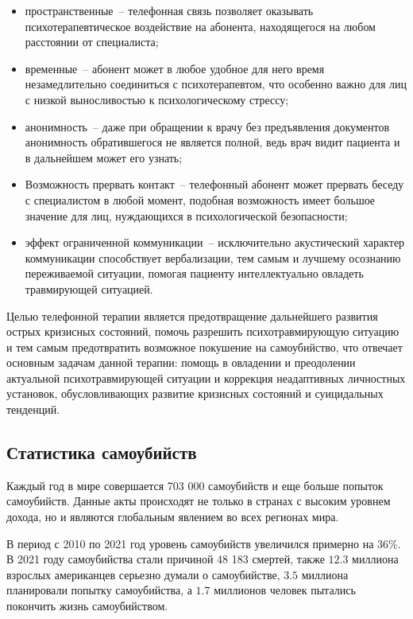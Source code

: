 \begin{itemize}
	\item пространственные~-- телефонная связь позволяет оказывать психотерапевтическое воздействие на абонента, находящегося на любом расстоянии от специалиста;
	\item временные~-- абонент может в любое удобное для него время незамедлительно соединиться с психотерапевтом, что особенно важно для лиц с низкой выносливостью к психологическому стрессу;
	\item анонимность~-- даже при обращении к врачу без предъявления документов анонимность обратившегося не является полной, ведь врач видит пациента и в дальнейшем может его узнать;
	\item Возможность прервать контакт~-- телефонный абонент может прервать беседу с специалистом в любой момент, подобная возможность имеет большое значение для лиц, нуждающихся в психологической безопасности;
	\item эффект ограниченной коммуникации~-- исключительно акустический характер коммуникации способствует вербализации, тем самым и лучшему осознанию переживаемой ситуации, помогая пациенту интеллектуально овладеть травмирующей ситуацией.
\end{itemize}

Целью телефонной терапии является предотвращение дальнейшего развития острых кризисных состояний, помочь разрешить психотравмирующую ситуацию и тем самым предотвратить возможное покушение на самоубийство, что отвечает основным задачам данной терапии: помощь в овладении и преодолении актуальной психотравмирующей ситуации и коррекция неадаптивных личностных установок, обусловливающих развитие кризисных состояний и суицидальных тенденций.

\subsection{Статистика самоубийств}
Каждый год в мире совершается 703 000 самоубийств и еще больше попыток самоубийств. Данные акты происходят не только в странах с высоким уровнем дохода, но и являются глобальным явлением во всех регионах мира.~\cite{suicideVOZDouble}

В период с 2010 по 2021 год уровень самоубийств увеличился примерно на $36\%$. В 2021 году самоубийства стали причиной 48 183 смертей, также $12.3$ миллиона взрослых американцев серьезно думали о самоубийстве, $3.5$ миллиона планировали попытку самоубийства, а $1.7$ миллионов человек пытались покончить жизнь самоубийством.~\cite{suicideStats}

